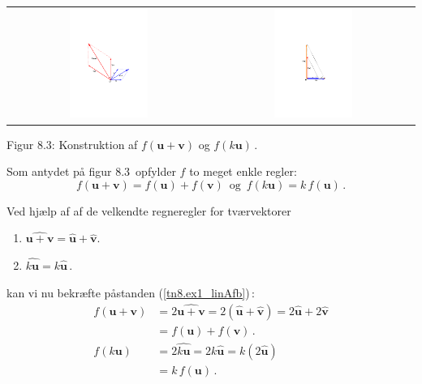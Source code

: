 \begin{center}
\begin{tabular}{cc}

\includegraphics[trim=5cm 9.6cm 5cm
 9.5cm,width=0.40\textwidth,clip]{tvarVektor3.pdf}
&
\includegraphics[trim=5cm 9.6cm 5cm
 9.5cm,width=0.40\textwidth,clip]{tvarVektor4.pdf}
\end{tabular}

Figur 8.3: Konstruktion af $f(\mathbf u + \mathbf v)$ og $f(k\mathbf u)\,.$

\end{center}

Som antydet på figur 8.3\, opfylder $f$ to meget enkle regler:
\begin{equation}\label{tn8.ex1_linAfb}
f(\mathbf u + \mathbf v)=f(\mathbf u) + f(\mathbf v) 
\,\,\,\mathrm{og}\,\,\,f(k\mathbf u)=k\,f(\mathbf u)\,.
\end{equation}

Ved hjælp af af de velkendte regneregler for tværvektorer
\begin{enumerate}
\item
$\widehat{\mathbf u + \mathbf v}=\hat{\mathbf u} + \hat{\mathbf v}$.
\item
$\widehat{k\mathbf u}=k\hat{\mathbf u}\,.$
\end{enumerate}
kan vi nu bekræfte påstanden (\ref{tn8.ex1_linAfb})\,:
\begin{align*}
f(\mathbf u + \mathbf v)&=2\widehat{\mathbf u + \mathbf v}=2(\hat{\mathbf u} + \hat{\mathbf v})=2\hat{\mathbf u} + 2\hat{\mathbf v}\\&=f(\mathbf u) + f(\mathbf v)\,.\\
f(k\mathbf u)&=2\widehat{k\mathbf u}=2k\hat{\mathbf u}=k(2\hat{\mathbf u})\\&
=k\,f(\mathbf u)\,.
\end{align*}

